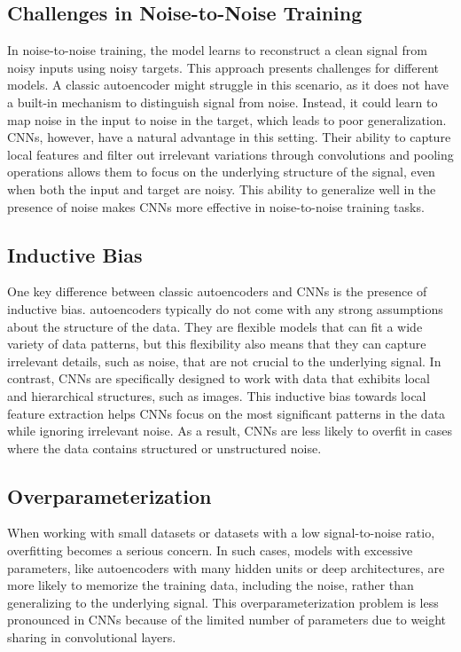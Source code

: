 \documentclass[10pt,conference,compsocconf]{IEEEtran}
\begin{document}
\subsection{Challenges in Noise-to-Noise Training}
In noise-to-noise training, the model learns to reconstruct a clean signal from noisy inputs using noisy targets. This approach presents challenges for different 
models. A classic autoencoder might struggle in this scenario, as it does not have a built-in mechanism to distinguish signal from noise. Instead, it could learn 
to map noise in the input to noise in the target, which leads to poor generalization. CNNs, however, have a natural advantage in this setting. Their ability to 
capture local features and filter out irrelevant variations through convolutions and pooling operations allows them to focus on the underlying structure of the 
signal, even when both the input and target are noisy. This ability to generalize well in the presence of noise makes CNNs more effective in noise-to-noise training 
tasks.

\subsection{Inductive Bias}
One key difference between classic autoencoders and CNNs is the presence of inductive bias. autoencoders typically do not come with any strong 
assumptions about the structure of the data. They are flexible models that can fit a wide variety of data patterns, but this flexibility also means 
that they can capture irrelevant details, such as noise, that are not crucial to the underlying signal. In contrast, CNNs are specifically designed 
to work with data that exhibits local and hierarchical structures, such as images. This inductive bias towards local feature extraction helps CNNs 
focus on the most significant patterns in the data while ignoring irrelevant noise. As a result, CNNs are less likely to overfit in cases where the 
data contains structured or unstructured noise.

\subsection{Overparameterization}
When working with small datasets or datasets with a low signal-to-noise ratio, overfitting becomes a serious concern. In such cases, 
models with excessive parameters, like autoencoders with many hidden units or deep architectures, are more likely to memorize the 
training data, including the noise, rather than generalizing to the underlying signal. This overparameterization problem is less 
pronounced in CNNs because of the limited number of parameters due to weight sharing in convolutional layers. 
\end{document}
